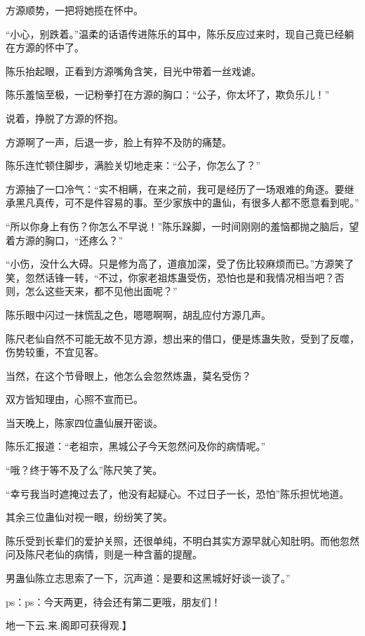 \begin{this_body}
方源顺势，一把将她揽在怀中。

“小心，别跌着。”温柔的话语传进陈乐的耳中，陈乐反应过来时，现自己竟已经躺在方源的怀中了。

陈乐抬起眼，正看到方源嘴角含笑，目光中带着一丝戏谑。

陈乐羞恼至极，一记粉拳打在方源的胸口：“公子，你太坏了，欺负乐儿！”

说着，挣脱了方源的怀抱。

方源啊了一声，后退一步，脸上有猝不及防的痛楚。

陈乐连忙顿住脚步，满脸关切地走来：“公子，你怎么了？”

方源抽了一口冷气：“实不相瞒，在来之前，我可是经历了一场艰难的角逐。要继承黑凡真传，可不是件容易的事。至少家族中的蛊仙，有很多人都不愿意看到呢。”

“所以你身上有伤？你怎么不早说！”陈乐跺脚，一时间刚刚的羞恼都抛之脑后，望着方源的胸口，“还疼么？”

“小伤，没什么大碍。只是修为高了，道痕加深，受了伤比较麻烦而已。”方源笑了笑，忽然话锋一转，“不过，你家老祖炼蛊受伤，恐怕也是和我情况相当吧？否则，怎么这些天来，都不见他出面呢？”

陈乐眼中闪过一抹慌乱之色，嗯嗯啊啊，胡乱应付方源几声。

陈尺老仙自然不可能无故不见方源，想出来的借口，便是炼蛊失败，受到了反噬，伤势较重，不宜见客。

当然，在这个节骨眼上，他怎么会忽然炼蛊，莫名受伤？

双方皆知理由，心照不宣而已。

当天晚上，陈家四位蛊仙展开密谈。

陈乐汇报道：“老祖宗，黑城公子今天忽然问及你的病情呢。”

“哦？终于等不及了么”陈尺笑了笑。

“幸亏我当时遮掩过去了，他没有起疑心。不过日子一长，恐怕”陈乐担忧地道。

其余三位蛊仙对视一眼，纷纷笑了笑。

陈乐受到长辈们的爱护关照，还很单纯，不明白其实方源早就心知肚明。而他忽然问及陈尺老仙的病情，则是一种含蓄的提醒。

男蛊仙陈立志思索了一下，沉声道：是要和这黑城好好谈一谈了。”

ps：ps：今天两更，待会还有第二更哦，朋友们！

地一下云.来.阁即可获得观.】

\end{this_body}

